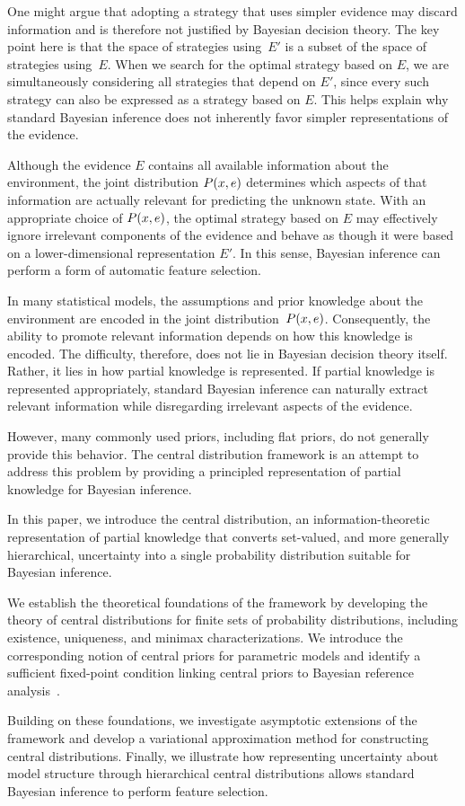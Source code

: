 One might argue that adopting a strategy that uses simpler evidence may discard information and is therefore not
justified by Bayesian decision theory.
The key point here is that the space of strategies using~$E'$ is a subset of the space of strategies using~$E$.
When we search for the optimal strategy based on $E$, we are simultaneously considering all strategies that
depend on $E'$, since every such strategy can also be expressed as a strategy based on $E$.
This helps explain why standard Bayesian inference does not inherently favor simpler representations of the evidence.

Although the evidence $E$ contains all available information about the environment, the joint distribution
$P(x,e)$ determines which aspects of that information are actually relevant for predicting the unknown state.
With an appropriate choice of $P(x,e)$, the optimal strategy based on $E$ may effectively ignore irrelevant
components of the evidence and behave as though it were based on a lower-dimensional representation $E'$.
In this sense, Bayesian inference can perform a form of automatic feature selection.

In many statistical models, the assumptions and prior knowledge about the environment are encoded in the joint
distribution~$P(x,e)$.
Consequently, the ability to promote relevant information depends on how this knowledge is encoded.
The difficulty, therefore, does not lie in Bayesian decision theory itself.
Rather, it lies in how partial knowledge is represented.
If partial knowledge is represented appropriately, standard Bayesian inference can naturally extract relevant
information while disregarding irrelevant aspects of the evidence.

However, many commonly used priors, including flat priors, do not generally provide this behavior.
The central distribution framework is an attempt to address this problem by providing a principled representation of
partial knowledge for Bayesian inference.

In this paper, we introduce the central distribution, an information-theoretic representation of partial
knowledge that converts set-valued, and more generally hierarchical, uncertainty into a single probability
distribution suitable for Bayesian inference.

We establish the theoretical foundations of the framework by developing the theory of central distributions for finite
sets of probability distributions, including existence, uniqueness, and minimax characterizations.
We introduce the corresponding notion of central priors for parametric models and identify a sufficient fixed-point
condition linking central priors to Bayesian reference analysis~\cite{BERNARDO200517}.

Building on these foundations, we investigate asymptotic extensions of the framework and develop a variational
approximation method for constructing central distributions.
Finally, we illustrate how representing uncertainty about model structure through hierarchical central distributions
allows standard Bayesian inference to perform feature selection.
